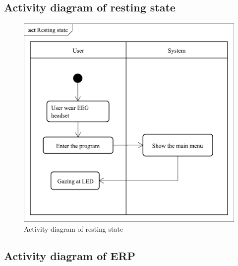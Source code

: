 \subsection{Activity diagram of resting state}

\begin{figure}[ht]
\centering \includegraphics[scale=0.31]{chapter4/Rest.pdf}
\caption{Activity diagram of resting state}
\end{figure}


\subsection{Activity diagram of ERP}

